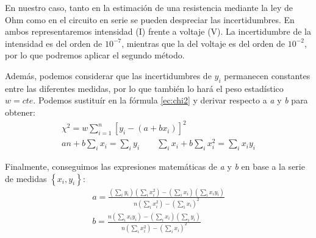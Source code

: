 \documentclass[12pt, a4paper, titlepage]{article}
\begin{document}
  En nuestro caso, tanto en la estimación de una resistencia mediante la ley de Ohm como en el circuito en serie se pueden despreciar las incertidumbres. En ambos representaremos intensidad (I) frente a voltaje (V). La incertidumbre de la intensidad es del orden de $10^{-7}$, mientras que la del voltaje es del orden de $10^{-2}$, por lo que podremos aplicar el segundo método.

  Además, podemos considerar que las incertidumbres de $y_i$ permanecen constantes entre las diferentes medidas, por lo que también lo hará el peso estadístico $w = cte$. Podemos sustituír en la fórmula \ref{ec:chi2} y derivar respecto a \textit{a} y \textit{b} para obtener:
  \begin{gather}
    \chi^2 = w\sum^{n}_{i=1}[y_i - (a + bx_i)]^2 \nonumber \\
    a n + b\sum_{i}x_i = \sum_{i}y_i \quad \quad \sum_{i}x_i + b\sum_{i}x_i^2 = \sum_{i}x_i y_i \label{ec:dchi}
  \end{gather}

  Finalmente, conseguimos las expresiones matemáticas de \textit{a} y \textit{b} en base a la serie de medidas $\left\{ x_i, y_i \right\}$:
  \begin{gather}
    a = \frac{\left ( \sum_i y_i \right )\left ( \sum_i x_i^2 \right ) - \left ( \sum_i x_i \right )\left ( \sum_i x_i y_i \right )}{n\left ( \sum_i x_i^2 \right ) - \left ( \sum_i x_i \right )^2} \label{ec:a} \\
    b = \frac{n\left ( \sum_i x_i y_i \right ) - \left ( \sum_i x_i \right )\left ( \sum_i y_i \right )}{n\left ( \sum_i x_i^2 \right )-\left ( \sum_i x_i \right )^2} \label{ec:b}
  \end{gather}
\end{document}
